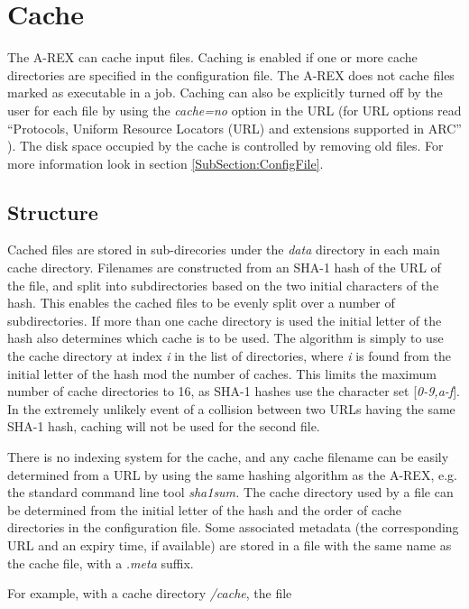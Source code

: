 \documentclass{article}                            %
\begin{document}
\section{Cache\label{sec:cache}}

The A-REX can cache input files. Caching is enabled if one or more cache
directories are specified in the configuration file. The A-REX does not
cache files marked as executable in a job. Caching can also be explicitly
turned off by the user for each file by using the\textit{ cache=no}
option in the URL (for URL options read {}``Protocols, Uniform Resource
Locators (URL) and extensions supported in ARC'' \cite{urls}). The
disk space occupied by the cache is controlled by removing old files.
For more information look in section \ref{SubSection:ConfigFile}.


\subsection{Structure}

Cached files are stored in sub-direcories under the \emph{data} directory
in each main cache directory. Filenames are constructed from an SHA-1
hash of the URL of the file, and split into subdirectories based on
the two initial characters of the hash. This enables the cached files
to be evenly split over a number of subdirectories. If
more than one cache directory is used the initial letter of the hash
also determines which cache is to be used. The algorithm is simply
to use the cache directory at index \emph{i} in the list of directories,
where \emph{i} is found from the initial letter of the hash mod the
number of caches. This limits the maximum number of cache directories
to 16, as SHA-1 hashes use the character set {[}\emph{0-9,a-f}]. In
the extremely unlikely event of a collision between two URLs having
the same SHA-1 hash, caching will not be used for the second file.

There is no indexing system for the cache, and any cache filename
can be easily determined from a URL by using the same hashing algorithm
as the A-REX, e.g. the standard command line tool \emph{sha1sum. }The
cache directory used by a file can be determined from the initial
letter of the hash and the order of cache directories in the configuration
file. Some associated metadata (the corresponding URL and an expiry
time, if available) are stored in a file with the same name as the
cache file, with a \emph{.meta} suffix.

For example, with a cache directory \emph{/cache}, the file 
\end{document}
